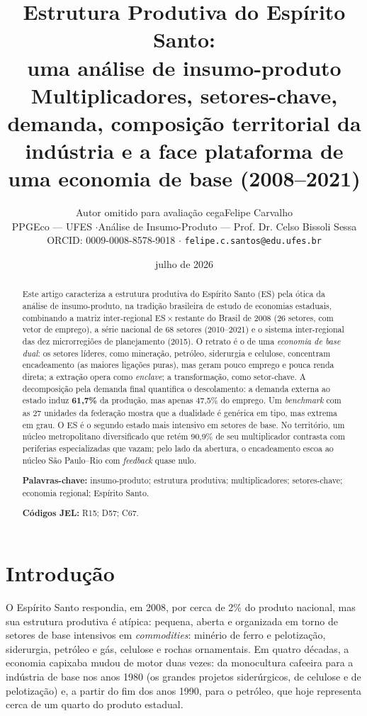 \documentclass[11pt,a4paper]{article}
\title{\textbf{Estrutura Produtiva do Espírito Santo:\\ uma análise de insumo-produto}\\[2pt]
\large Multiplicadores, setores-chave, demanda, composição territorial da indústria e a face
plataforma de uma economia de base (2008--2021)}
\author{\ifanon Autor omitido para avaliação cega\else Felipe Carvalho\\
\small PPGEco --- UFES \quad$\cdot$\quad Análise de Insumo-Produto --- Prof. Dr. Celso Bissoli Sessa\\
\small ORCID: 0009-0008-8578-9018 \quad$\cdot$\quad
\texttt{felipe.c.santos@edu.ufes.br}\fi}
\date{julho de 2026}
\begin{document}
\maketitle
\thispagestyle{empty}

\begin{abstract}
\noindent
Este artigo caracteriza a estrutura produtiva do Espírito Santo (ES) pela ótica da análise de
insumo-produto, na tradição brasileira de estudo de economias estaduais, combinando a
matriz inter-regional ES\,$\times$\,restante do Brasil de 2008 (26 setores, com vetor de emprego),
a série nacional de 68 setores (2010--2021) e o sistema inter-regional das dez
microrregiões de planejamento (2015). O retrato é o de uma \emph{economia de base dual}:
os setores líderes, como mineração, petróleo, siderurgia e celulose, concentram
encadeamento (as maiores ligações puras), mas geram pouco emprego e pouca renda direta;
a extração opera como \emph{enclave}; a transformação, como setor-chave. A decomposição pela
demanda final quantifica o descolamento: a demanda externa ao estado induz \textbf{61,7\%}
da produção, mas apenas 47,5\% do emprego. Um \emph{benchmark} com as 27 unidades da federação
mostra que a dualidade é genérica em tipo, mas extrema em grau. O ES é o segundo estado
mais intensivo em setores de base. No território, um núcleo metropolitano diversificado que
retém 90,9\% de seu multiplicador contrasta com periferias especializadas que vazam; pelo lado
da abertura, o encadeamento escoa ao núcleo São Paulo--Rio com \emph{feedback} quase nulo.

\vspace{0.6em}
\noindent\textbf{Palavras-chave:} insumo-produto; estrutura produtiva; multiplicadores;
setores-chave; economia regional; Espírito Santo.

\noindent\textbf{Códigos JEL:} R15; D57; C67.

\vspace{1.1em}
\end{abstract}
\section{Introdução}
\label{sec:intro}
O Espírito Santo respondia, em 2008, por cerca de 2\% do produto nacional, mas sua
estrutura produtiva é atípica: pequena, aberta e organizada em torno de setores de base
intensivos em \emph{commodities}: minério de ferro e pelotização, siderurgia, petróleo e gás,
celulose e rochas ornamentais. Em quatro décadas, a economia capixaba mudou de motor duas
vezes: da monocultura cafeeira para a indústria de base nos anos 1980 (os grandes projetos
siderúrgicos, de celulose e de pelotização) e, a partir do fim dos anos 1990, para o petróleo,
que hoje representa cerca de um quarto do produto estadual.
\end{document}
